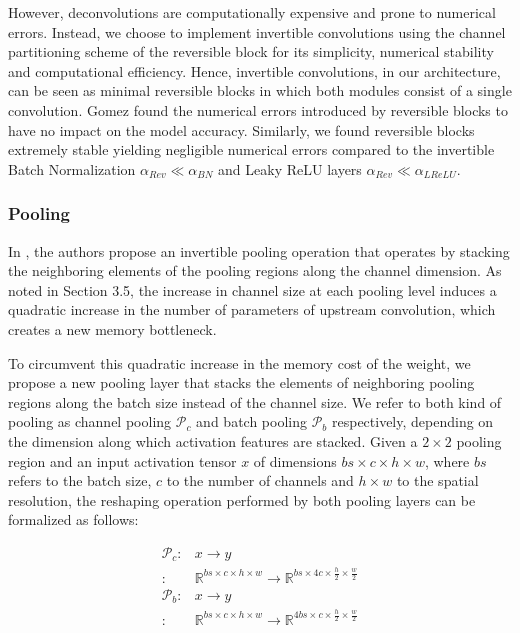 \documentclass[twocolumn]{bmcart}
\begin{document}
However, deconvolutions are computationally expensive and prone to numerical errors.
Instead, we choose to implement invertible convolutions using the channel partitioning scheme
of the reversible block for its simplicity, numerical stability and computational efficiency.
Hence, invertible convolutions, in our architecture, can be seen as minimal reversible blocks
in which both modules consist of a single convolution.
Gomez \etal \cite{gomez2017reversible} found the numerical errors introduced by reversible blocks to have no impact on the model accuracy.
Similarly, we found reversible blocks extremely stable yielding negligible numerical errors
compared to the invertible Batch Normalization $\alpha_{Rev} \ll \alpha_{BN}$
and Leaky ReLU layers $\alpha_{Rev} \ll \alpha_{LReLU}$.

\subsubsection{Pooling}

In \cite{jacobsen2018revnet}, the authors propose an invertible pooling operation that operates
by stacking the neighboring elements of the pooling regions along the channel dimension.
As noted in Section 3.5, the increase in channel size at each pooling level
induces a quadratic increase in the number of parameters of upstream convolution,
which creates a new memory bottleneck.

To circumvent this quadratic increase in the memory cost of the weight,
we propose a new pooling layer that stacks the elements of neighboring pooling regions along the batch size instead of the channel size.
We refer to both kind of pooling as channel pooling $\mathcal{P}_c$ and batch pooling $\mathcal{P}_b$ respectively,
depending on the dimension along which activation features are stacked.
Given a $2 \times 2$ pooling region and an input activation tensor $x$ of dimensions $bs \times c \times h \times w$,
where $bs$ refers to the batch size, $c$ to the number of channels and $h \times w$ to the spatial resolution,
the reshaping operation performed by both pooling layers can be formalized as follows:

\begin{subequations}
\begin{align}
	\mathcal{P}_c :& x \rightarrow y \\
	              :&  \mathbb{R}^{bs \times c \times h \times w}  \rightarrow \mathbb{R}^{bs \times 4c \times \frac{h}{2} \times \frac{w}{2}}\\
	\mathcal{P}_b :& x \rightarrow y \\
                      :&  \mathbb{R}^{bs \times c \times h \times w}  \rightarrow \mathbb{R}^{4bs \times c \times \frac{h}{2} \times \frac{w}{2}}
\end{align}
\end{subequations}
\end{document}

